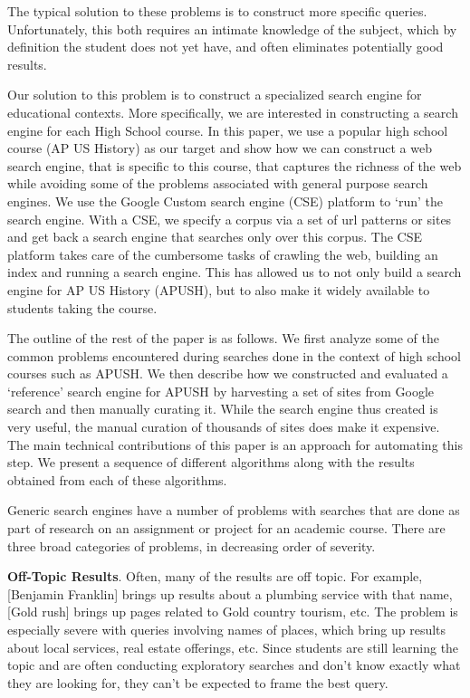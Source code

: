 \documentclass{acm_proc_article-sp}
\begin{document}
The typical solution to these problems is to construct more specific
queries. Unfortunately, this both requires an intimate knowledge of the subject,
which by definition the student does not yet have, and often eliminates
potentially good results. 

Our solution to this problem is to construct a specialized search engine for
educational contexts. More specifically, we are interested in constructing a
search engine for each High School course. In this paper, we use a popular high
school course (AP US History) as our target and show how we can construct a web
search engine, that is specific to this course, that captures the richness of
the web while avoiding some of the problems associated with general purpose
search engines. We use the Google Custom search engine (CSE) platform to ‘run’
the search engine. With a CSE, we specify a corpus via a set of url patterns or
sites and get back a search engine that searches only over this corpus. The CSE
platform takes care of the cumbersome tasks of crawling the web, building an
index and running a search engine. This has allowed us to not only build a
search engine for AP US History (APUSH), but to also make it widely available to
students taking the course. 

The outline of the rest of the paper is as follows. We first analyze some of the
common problems encountered during searches done in the context of high school
courses such as APUSH. We then describe how we constructed and evaluated a
‘reference’ search engine for APUSH by harvesting a set of sites from Google
search and then manually curating it. While the search engine thus created is
very useful, the manual curation of thousands of sites does make it
expensive. The main technical contributions of this paper is an approach for
automating this step. We present a sequence of different algorithms along with
the results obtained from each of these algorithms. 

Generic search engines have a number of problems with searches that are done as
part of research on an assignment or project for an academic course. There are
three broad categories of problems, in decreasing order of severity. 

{\bf Off-Topic Results}. Often, many of the results are off topic. For example,
[Benjamin Franklin] brings up results about a plumbing service with that name,
[Gold rush] brings up pages related to Gold country tourism, etc. The problem is
especially severe with queries involving names of places, which bring up results
about local services, real estate offerings, etc. Since students are still
learning the topic and are often conducting exploratory searches and don’t know
exactly what they are looking for, they can’t be expected to frame the best
query. 
\end{document}
